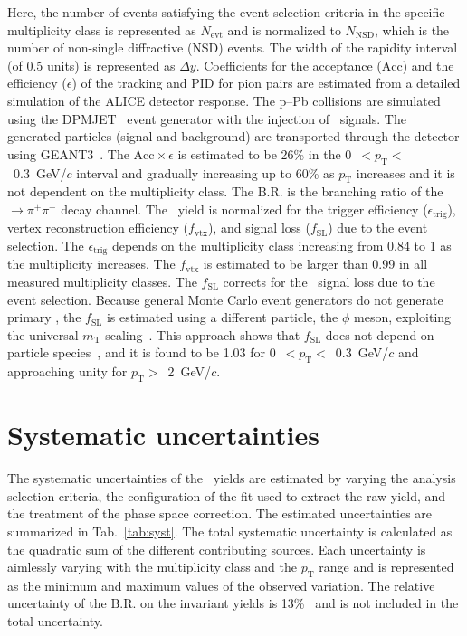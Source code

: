 Here, the number of events satisfying the event selection criteria in the specific multiplicity class is represented as $N_{\mathrm{evt}}$ and is normalized to $N_{\mathrm{NSD}}$, which is the number of non-single diffractive (NSD) events. The width of the rapidity interval (of 0.5 units) is represented as $\Delta y$. Coefficients for the acceptance ($\mathrm{Acc}$) and the efficiency ($\epsilon$) of the tracking and PID for pion pairs are estimated from a detailed simulation of the ALICE detector response. The p--Pb collisions are simulated using the DPMJET~\cite{Fedynitch:2015kcn} event generator with the injection of \fzero~signals. The generated particles (signal and background) are transported through the detector using GEANT3~\cite{Brun:1994aa}. The $\mathrm{Acc}\times\epsilon$ is estimated to be 26\% in the 0~$<p_{\mathrm{T}}<$~0.3~GeV/$c$ interval and gradually increasing up to 60\% as $p_{\mathrm{T}}$ increases and it is not dependent on the multiplicity class. The $\mathrm{B.R.}$ is the branching ratio of the \fzero~$\rightarrow \pi^{+}\pi^{-}$ decay channel. The \fzero~yield is normalized for the trigger efficiency ($\epsilon_{\mathrm{trig}}$), vertex reconstruction efficiency ($f_{\mathrm{vtx}}$), and signal loss ($f_{\mathrm{SL}}$) due to the event selection. The $\epsilon_{\mathrm{trig}}$ depends on the multiplicity class increasing from 0.84 to 1 as the multiplicity increases. The $f_{\mathrm{vtx}}$ is estimated to be larger than 0.99 in all measured multiplicity classes. The $f_{\mathrm{SL}}$ corrects for the \fzero~signal loss due to the event selection. Because general Monte Carlo event generators do not generate primary \fzero, the $f_{\mathrm{SL}}$ is estimated using a different particle, the $\phi$ meson, exploiting the universal $m_{\mathrm{T}}$ scaling~\cite{Altenkamper:2017qot}. This approach shows that $f_{\mathrm{SL}}$ does not depend on particle species~\cite{ALICE:2019xyr}, and it is found to be 1.03 for 0~$<p_{\mathrm{T}}<$~0.3~GeV/$c$ and approaching unity for $p_{\mathrm{T}}>$~2~GeV/$c$.

\section{Systematic uncertainties}
\label{sec:syst}
The systematic uncertainties of the \fzero~yields are estimated by varying the analysis selection criteria, the configuration of the fit used to extract the raw yield, and the treatment of the phase space correction. The estimated uncertainties are summarized in Tab.~\ref{tab:syst}. The total systematic uncertainty is calculated as the quadratic sum of the different contributing sources. Each uncertainty is aimlessly varying with the multiplicity class and the $p_{\mathrm{T}}$ range and is represented as the minimum and maximum values of the observed variation. The relative uncertainty of the $\mathrm{B.R.}$ on the invariant yields is 13\%~\cite{Stone:2013eaa} and is not included in the total uncertainty.

